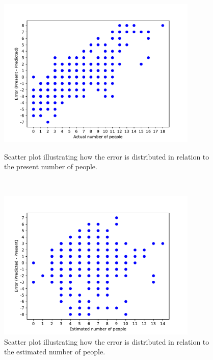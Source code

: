 \begin{figure}[h!]
\begin{minipage}[b]{8.5cm}
\centering
\includegraphics[width=0.85\textwidth]{images/scatterplotpres}
\caption{Scatter plot illustrating how the error is distributed in relation to the present number of people.}
\label{fig:scatterplotpres}
\end{minipage}
\ \hspace{2mm} \hspace{3mm} \
\begin{minipage}[b]{8.5cm}
\centering
\includegraphics[width=0.85\textwidth]{images/scatterplotest}
\caption{Scatter plot illustrating how the error is distributed in relation to the estimated number of people.}
\label{fig:scatterplotest}
\end{minipage}
\end{figure}



